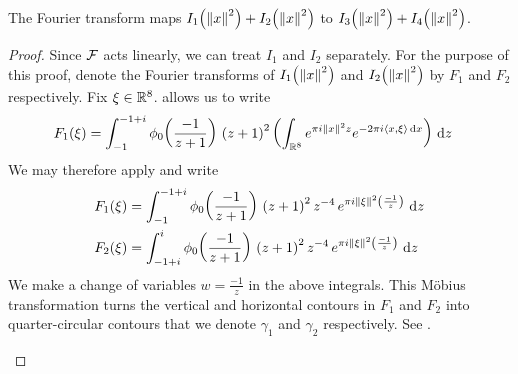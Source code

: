 \begin{boxlemma}\label{Ch4:Lemma:Fourier_I_1_add_I_2_eq_I_3_add_I_4}
    The Fourier transform %
    maps $I_1\!\left( \left\lVert x \right\rVert^2 \right) + I_2\!\left( \left\lVert x \right\rVert^2 \right)$ to $I_3\!\left( \left\lVert x \right\rVert^2 \right) + I_4\!\left( \left\lVert x \right\rVert^2 \right)$.
\end{boxlemma}
\begin{proof}
    Since $\mathcal{F}$ acts linearly, we can treat $I_1$ and $I_2$ separately. For the purpose of this proof, denote the Fourier transforms of $I_1\!\left( \left\lVert x \right\rVert^2 \right)$ and $I_2\!\left( \left\lVert x \right\rVert^2 \right)$ by $F_1$ and $F_2$ respectively. Fix $\xi \in \mathbb{R}^8$.  allows us to write
    \begin{align*}
        F_1\!\left( \xi \right)
        &= \int_{-1}^{-1 + i} \phi_0\!\left( \frac{-1}{z+1} \right) \, \left( z + 1 \right)^2 \left( \int_{\mathbb{R}^8} e^{\pi i \left\lVert x \right\rVert^2 z} e^{-2\pi i \left\langle x, \xi \right\rangle \operatorname{d}\!{x}} \right) \, \operatorname{d}\!{z}
    \end{align*}
    We may therefore apply  and write
    \begin{align*}
        F_1\!\left( \xi \right) &= \int_{-1}^{-1 + i} \phi_0\!\left( \frac{-1}{z+1} \right) \, \left( z + 1 \right)^2z^{-4} \, e^{\pi i \left\lVert \xi \right\rVert^2 \left( \frac{-1}{z} \right)} \, \operatorname{d}\!{z} \\
        F_2\!\left( \xi \right) &= \int_{-1 + i}^{i} \phi_0\!\left( \frac{-1}{z+1} \right) \, \left( z + 1 \right)^2z^{-4} \, e^{\pi i \left\lVert \xi \right\rVert^2 \left( \frac{-1}{z} \right)} \, \operatorname{d}\!{z}
    \end{align*}
    We make a change of variables $w = \frac{-1}{z}$ in the above integrals. This Möbius transformation turns the vertical and horizontal contours in $F_1$ and $F_2$ into quarter-circular contours that we denote $\gamma_1$ and $\gamma_2$ respectively. See .

    \begin{figure}[htb]
        \centering
        \begin{subfigure}{0.4\linewidth}
            \centering
\end{subfigure}
\end{figure}
\end{proof}
